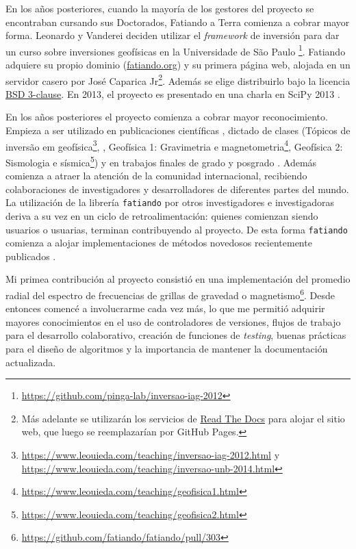 En los años posteriores, cuando la mayoría de los gestores del proyecto se
encontraban cursando sus Doctorados, Fatiando a Terra comienza a cobrar mayor
forma.
Leonardo y Vanderei deciden utilizar el \emph{framework} de inversión para dar
un curso sobre inversiones geofísicas en la Universidade de São Paulo%
\footnote{\url{https://github.com/pinga-lab/inversao-iag-2012}}.
Fatiando adquiere su propio dominio
(\href{https://www.fatiando.org}{fatiando.org}) y su primera página web,
alojada en un servidor casero por José Caparica Jr\footnote{%
    Más adelante se utilizarán los servicios de
    \href{https://readthedocs.org/}{Read The Docs} para alojar el sitio web,
    que luego se reemplazarían por GitHub Pages.
}.
Además se elige distribuirlo bajo la licencia
\href{https://opensource.org/licenses/BSD-3-Clause}{BSD 3-clause}.
En 2013, el proyecto es presentado en una charla en SciPy 2013
\citep{uieda2013}.

En los años posteriores el proyecto comienza a cobrar mayor reconocimiento.
Empieza a ser utilizado en publicaciones científicas
\citep[][entre otros]{%
    uieda2012,
    carlos2014,
    oliveira2015,
    hidalgogato2015,
    carlos2016,
    reis2016,
    uieda2017,
    hidalgogato2017,
    siqueira2017%
},
dictado de clases
(Tópicos de inversão em
geofísica\footnote{%
    \url{https://www.leouieda.com/teaching/inversao-iag-2012.html}
    y \url{https://www.leouieda.com/teaching/inversao-unb-2014.html}
},
\citet{uieda2014},
Geofísica 1: Gravimetria e magnetometria\footnote{%
    \url{https://www.leouieda.com/teaching/geofisica1.html}
},
Geofísica 2: Sismologia e sísmica\footnote{%
    \url{https://www.leouieda.com/teaching/geofisica2.html}
})
y en trabajos finales de grado y posgrado
\citep{carlos2013, sales2014, soler2015, uieda2016b, melo2020}.
Además comienza a atraer la atención de la comunidad internacional, recibiendo
colaboraciones de investigadores y desarrolladores de diferentes partes del
mundo.
La utilización de la librería \texttt{fatiando} por otros investigadores
e investigadoras deriva a su vez en un ciclo de retroalimentación: quienes
comienzan siendo usuarios o usuarias, terminan contribuyendo al proyecto.
De esta forma \texttt{fatiando} comienza a alojar implementaciones de métodos
novedosos recientemente publicados \citep{uieda2012b, oliveira2013}.

Mi primea contribución al proyecto consistió en una implementación del promedio
radial del espectro de frecuencias de grillas de gravedad
o magnetismo\footnote{%
    \url{https://github.com/fatiando/fatiando/pull/303}
}.
Desde entonces comencé a involucrarme cada vez más, lo que me permitió adquirir
mayores conocimientos en el uso de controladores de versiones, flujos de
trabajo para el desarrollo colaborativo, creación de funciones de
\emph{testing}, buenas prácticas para el diseño de algoritmos y la importancia
de mantener la documentación actualizada.

